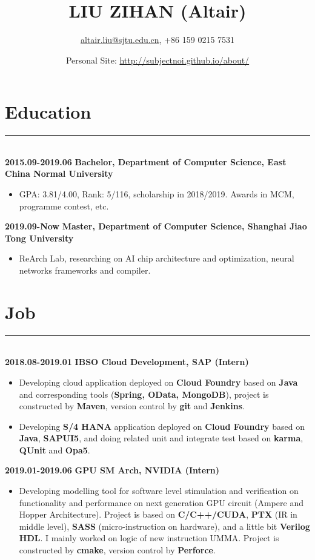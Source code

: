 \documentclass[a4paper]{article}
\title{LIU ZIHAN (Altair)}
\author{\url{altair.liu@sjtu.edu.cn}, +86 159 0215 7531}
\date{Personal Site: \url{http://subjectnoi.github.io/about/}}
\begin{document}
		\maketitle
		\section*{Education}
		\rule[1pt]{18cm}{0.01em}\\
		\textbf{2015.09-2019.06} \hfill \textbf{Bachelor, Department of Computer Science, East China Normal University}
		\begin{itemize}
		\item GPA: 3.81/4.00, Rank: 5/116, scholarship in 2018/2019. Awards in MCM, programme contest, etc.
		\end{itemize}
		\textbf{2019.09-Now} \hfill \textbf{Master, Department of Computer Science, Shanghai Jiao Tong University}
		\begin{itemize}
		\item ReArch Lab, researching on AI chip architecture and optimization, neural networks frameworks and compiler. 
		\end{itemize}
		\section*{Job}
		\rule[1pt]{18cm}{0.01em}\\
		\textbf{2018.08-2019.01} \hfill \textbf{IBSO Cloud Development, SAP (Intern)}
		\begin{itemize}
		\item Developing cloud application deployed on \textbf{Cloud Foundry} based on \textbf{Java} and corresponding tools (\textbf{Spring, OData, MongoDB}), project is constructed by \textbf{Maven}, version control by \textbf{git} and \textbf{Jenkins}.
		\item Developing \textbf{S/4 HANA} application deployed on \textbf{Cloud Foundry} based on \textbf{Java}, \textbf{SAPUI5}, and doing related unit and integrate test based on \textbf{karma}, \textbf{QUnit} and \textbf{Opa5}.
		\end{itemize}
		\textbf{2019.01-2019.06} \hfill \textbf{GPU SM Arch, NVIDIA (Intern)}
		\begin{itemize}
		\item Developing modelling tool for software level stimulation and verification on functionality and performance on next generation GPU circuit (Ampere and Hopper Architecture). Project is based on \textbf{C/C++/CUDA}, \textbf{PTX} (IR in middle level), \textbf{SASS} (micro-instruction on hardware), and a little bit \textbf{Verilog HDL}. I mainly worked on logic of new instruction UMMA. Project is constructed by \textbf{cmake}, version control by \textbf{Perforce}.
		\end{itemize}
\end{document}
